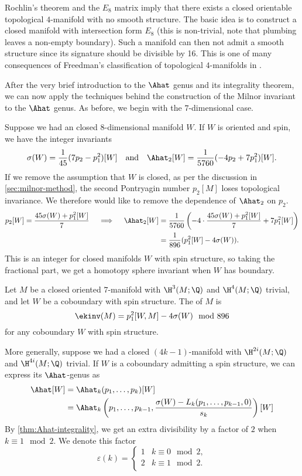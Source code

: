 \begin{remark}\label{rmk:E8-manifold}
	Rochlin's theorem and the $E_8$ matrix imply that there exists a closed orientable topological $4$-manifold with no smooth structure. The basic idea is to construct a closed manifold with intersection form $E_8$ (this is non-trivial, note that plumbing leaves a non-empty boundary). 
	Such a manifold can then not admit a smooth structure since its signature should be divisible by 16. This is one of many consequences of Freedman's classification of topological $4$-manifolds in \cite{freedman1982manifold}.
\end{remark}

After the very brief introduction to the $\Ahat$ genus and its integrality theorem, we can now apply the techniques behind the construction of the Milnor invariant to the $\Ahat$ genus. As before, we begin with the $7$-dimensional case. 

Suppose we had an closed $8$-dimensional manifold $W$. If $W$ is oriented and spin, we have the integer invariants
\[
	\sigma(W) = \frac{1}{45}(7p_2- p_1^2)[W]\quad\textrm{and}\quad\Ahat_2[W] = \frac{1}{5760}(-4p_2 + 7p_1^2)[W].
\]
If we remove the assumption that $W$ is closed, as per the discussion in \cref{sec:milnor-method}, the second Pontryagin number $p_2[M]$ loses topological invariance. We therefore would like to remove the dependence of $\Ahat_2$ on $p_2$. 
\[
\begin{aligned}
	p_2[W] = \frac{45\sigma(W) +p_1^2[W]}{7}\quad\implies\quad 
	\Ahat_2[W] &= \frac{1}{5760}\left(-4\cdot \frac{45\sigma(W) + p_1^2[W]}{7} + 7p_1^2[W]\right)\\
						 &=\frac{1}{896}(p_1^2[W]-4\sigma(W)).
\end{aligned}
\]
This is an integer for closed manifolds $W$ with spin structure, so taking the fractional part, we get a homotopy sphere invariant when $W$ has boundary.

\begin{definition}\label{def:eells-kupier-7-dimension}
	Let $M$ be a closed oriented $7$-manifold with $\H^3(M;\Q)$ and $\H^4(M;\Q)$ trivial, and let $W$ be a coboundary with spin structure. The  of $M$ is
	\[
		\ekinv(M) = p_1^2[W, M]-4\sigma(W)\mod 896
	\]
	for any coboundary $W$ with spin structure.
\end{definition}

More generally, suppose we had a closed $(4k-1)$-manifold with $\H^{2i}(M;\Q)$ and $\H^{4i}(M;\Q)$ trivial. If $W$ is a coboundary admitting a spin structure, we can express its $\Ahat$-genus as
\[
	\begin{aligned}
	\Ahat[W]&=\Ahat_k(p_1,\ldots, p_k)[W]\\
					&= \Ahat_k\left(p_1, \ldots, p_{k-1}, \frac{\sigma(W)-L_k(p_1,\ldots, p_{k-1},0)}{s_k}\right)[W]
	\end{aligned}
\]
By \cref{thm:Ahat-integrality}, we get an extra divisibility by a factor of $2$ when $k\equiv 1\mod 2$. We denote this factor 
\[
	\varepsilon(k) = 
	\begin{cases}
		1 & k\equiv 0 \mod 2,\\
		2 & k\equiv 1 \mod 2.\\
	\end{cases}
\] 

